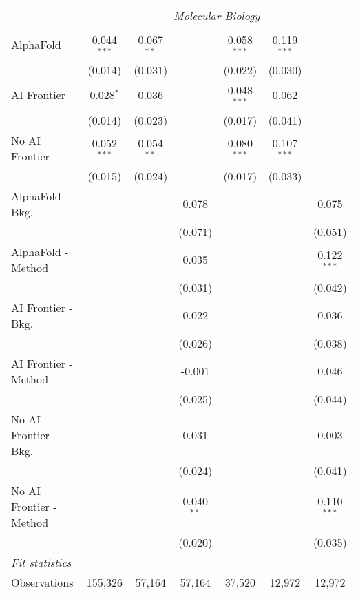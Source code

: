 \begin{tabular}{lcccccc}
 & \multicolumn{6}{c}{\textit{Molecular Biology}} \\ \\
   AlphaFold               & 0.044$^{***}$ & 0.067$^{**}$ &              & 0.058$^{***}$ & 0.119$^{***}$ &   \\   
                           & (0.014)       & (0.031)      &              & (0.022)       & (0.030)       &   \\   
   AI Frontier             & 0.028$^{*}$   & 0.036        &              & 0.048$^{***}$ & 0.062         &   \\   
                           & (0.014)       & (0.023)      &              & (0.017)       & (0.041)       &   \\   
   No AI Frontier          & 0.052$^{***}$ & 0.054$^{**}$ &              & 0.080$^{***}$ & 0.107$^{***}$ &   \\   
                           & (0.015)       & (0.024)      &              & (0.017)       & (0.033)       &   \\   
   AlphaFold - Bkg.        &               &              & 0.078        &               &               & 0.075\\   
                           &               &              & (0.071)      &               &               & (0.051)\\   
   AlphaFold - Method      &               &              & 0.035        &               &               & 0.122$^{***}$\\   
                           &               &              & (0.031)      &               &               & (0.042)\\   
   AI Frontier - Bkg.      &               &              & 0.022        &               &               & 0.036\\   
                           &               &              & (0.026)      &               &               & (0.038)\\   
   AI Frontier - Method    &               &              & -0.001       &               &               & 0.046\\   
                           &               &              & (0.025)      &               &               & (0.044)\\   
   No AI Frontier - Bkg.   &               &              & 0.031        &               &               & 0.003\\   
                           &               &              & (0.024)      &               &               & (0.041)\\   
   No AI Frontier - Method &               &              & 0.040$^{**}$ &               &               & 0.110$^{***}$\\   
                           &               &              & (0.020)      &               &               & (0.035)\\   
   \midrule
   \emph{Fit statistics}\\
   Observations            & 155,326       & 57,164       & 57,164       & 37,520        & 12,972        & 12,972\\  
   

\end{tabular}
